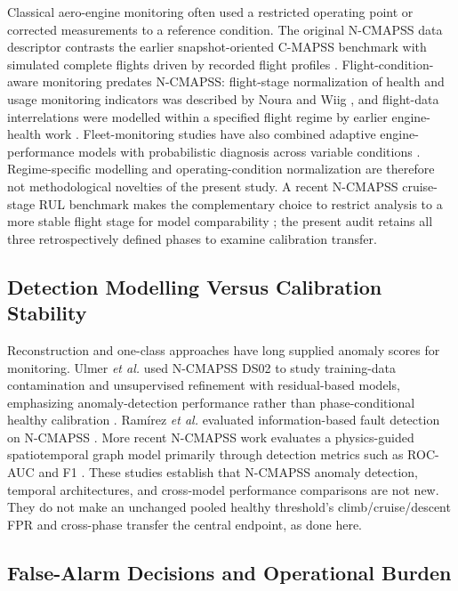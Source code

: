 \documentclass[preprint,12pt]{elsarticle}
\begin{document}
Classical aero-engine monitoring often used a restricted operating point or corrected measurements to a reference condition. The original N-CMAPSS data descriptor contrasts the earlier snapshot-oriented C-MAPSS benchmark with simulated complete flights driven by recorded flight profiles \cite{ref1}. Flight-condition-aware monitoring predates N-CMAPSS: flight-stage normalization of health and usage monitoring indicators was described by Noura and Wiig \cite{ref4}, and flight-data interrelations were modelled within a specified flight regime by earlier engine-health work \cite{ref3}. Fleet-monitoring studies have also combined adaptive engine-performance models with probabilistic diagnosis across variable conditions \cite{ref5}. Regime-specific modelling and operating-condition normalization are therefore not methodological novelties of the present study. A recent N-CMAPSS cruise-stage RUL benchmark makes the complementary choice to restrict analysis to a more stable flight stage for model comparability \cite{ref10}; the present audit retains all three retrospectively defined phases to examine calibration transfer.

\subsection{Detection Modelling Versus Calibration Stability}\label{detection-modelling-versus-calibration-stability}

Reconstruction and one-class approaches have long supplied anomaly scores for monitoring. Ulmer \emph{et al.} used N-CMAPSS DS02 to study training-data contamination and unsupervised refinement with residual-based models, emphasizing anomaly-detection performance rather than phase-conditional healthy calibration \cite{ref7}. Ramírez \emph{et al.} evaluated information-based fault detection on N-CMAPSS \cite{ref8}. More recent N-CMAPSS work evaluates a physics-guided spatiotemporal graph model primarily through detection metrics such as ROC-AUC and F1 \cite{ref9}. These studies establish that N-CMAPSS anomaly detection, temporal architectures, and cross-model performance comparisons are not new. They do not make an unchanged pooled healthy threshold's climb/cruise/descent FPR and cross-phase transfer the central endpoint, as done here.

\subsection{False-Alarm Decisions and Operational Burden}\label{false-alarm-decisions-and-operational-burden}
\end{document}

